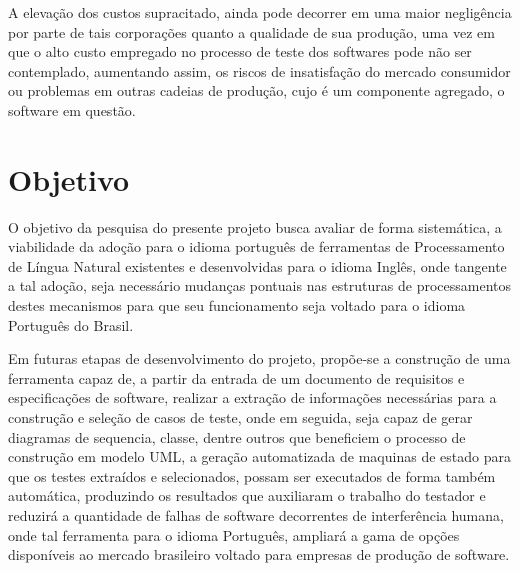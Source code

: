 A elevação dos custos supracitado, ainda pode decorrer em uma maior negligência por parte de tais corporações quanto a qualidade de sua produção, uma vez em que o alto custo empregado no processo de teste dos softwares pode não ser contemplado, aumentando assim, os riscos de insatisfação do mercado consumidor ou problemas em outras cadeias de produção, cujo é um componente agregado, o software em questão.

\section{Objetivo}
O objetivo da pesquisa do presente projeto busca avaliar de forma sistemática, a viabilidade da adoção para o idioma português de ferramentas de Processamento de Língua Natural existentes e desenvolvidas para o idioma Inglês, onde tangente a tal adoção, seja necessário mudanças pontuais nas estruturas de processamentos destes mecanismos para que seu funcionamento seja voltado para o idioma Português do Brasil.

Em futuras etapas de desenvolvimento do projeto, propõe-se a construção de uma ferramenta capaz de, a partir da entrada de um documento de requisitos e especificações de software, realizar a extração de informações necessárias para a construção e seleção de casos de teste, onde em seguida, seja capaz de gerar diagramas de sequencia, classe, dentre outros que beneficiem o processo de construção em modelo UML, a geração automatizada de maquinas de estado para que os testes extraídos e selecionados, possam ser executados de forma também automática, produzindo os resultados que auxiliaram o trabalho do testador e reduzirá a quantidade de falhas de software decorrentes de interferência humana, onde tal ferramenta para o idioma Português, ampliará a gama de opções disponíveis ao mercado brasileiro voltado para empresas de produção de software.



